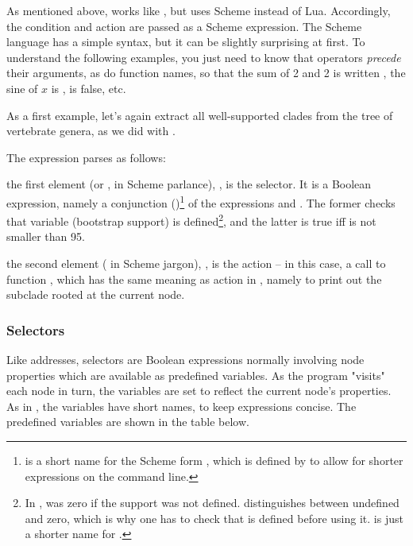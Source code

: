 As mentioned above, \sched{} works like \luaed{}, but uses Scheme
instead of Lua. Accordingly, the condition and action are passed as a Scheme
expression. The Scheme language has a simple syntax, but it can
be slightly surprising at first. To understand the following examples, you just
need to know that operators {\em precede} their arguments, as do function
names, so that the sum of 2 and 2 is written , the sine of $x$
is ,  is false, etc.

As a first example, let's again extract all
well-supported clades from the tree of vertebrate genera, as we did with \luaed.


The expression  parses as follows:
\startitemize
	\item the first element (or , in Scheme parlance),
	, is the selector.  It is a Boolean
	expression, namely a conjunction (\code{\&})\footnote{\code{\&} is
	a short name for the Scheme form , which is defined by
	\sched{} to allow for shorter expressions on the command line.} of the
	expressions  and .  The former
	checks that variable  (bootstrap support) is
	defined\footnote{In \ed,  was zero if the support was not
	defined. \sched{} distinguishes between undefined and zero, which is
	why one has to check that  is defined before using it.
	 is just a shorter name for .}, and the
	latter is true iff  is not smaller than 95.
	\item the second element ( in Scheme jargon),
	, is the action -- in this case, a call to function
	, which has the same meaning as action  in \ed,
	namely to print out the subclade rooted at the current node.
\stopitemize

\subsubsection{Selectors}

Like \ed{} addresses, \sched{} selectors are Boolean expressions normally
involving node properties which are available as predefined variables. As the
program "visits" each node in turn, the variables are set to reflect the current
node's properties. As in \ed{}, the variables have short names, to keep
expressions concise. The predefined variables are shown in the table below.

